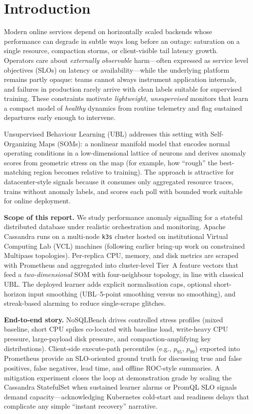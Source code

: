 \documentclass[sigconf]{acmart}
\begin{document}
\section{Introduction}
Modern online services depend on horizontally scaled backends whose performance can degrade in subtle ways long before an outage: saturation on a single resource, compaction storms, or client-visible tail latency growth. Operators care about \emph{externally observable} harm---often expressed as service level objectives (SLOs) on latency or availability---while the underlying platform remains partly opaque: teams cannot always instrument application internals, and failures in production rarely arrive with clean labels suitable for supervised training. These constraints motivate \emph{lightweight, unsupervised} monitors that learn a compact model of \emph{healthy} dynamics from routine telemetry and flag sustained departures early enough to intervene.

Unsupervised Behaviour Learning (UBL) addresses this setting with Self-Organizing Maps (SOMs): a nonlinear manifold model that encodes normal operating conditions in a low-dimensional lattice of neurons and derives anomaly scores from geometric stress on the map (for example, how ``rough'' the best-matching region becomes relative to training). The approach is attractive for datacenter-style signals because it consumes only aggregated resource traces, trains without anomaly labels, and scores each poll with bounded work suitable for online deployment.

\textbf{Scope of this report.}
We study performance anomaly signalling for a stateful distributed database under realistic orchestration and monitoring. Apache Cassandra runs on a multi-node \texttt{k3s} cluster hosted on institutional Virtual Computing Lab (VCL) machines (following earlier bring-up work on constrained Multipass topologies). Per-replica CPU, memory, and disk metrics are scraped with Prometheus and aggregated into cluster-level Tier~A feature vectors that feed a \emph{two-dimensional} SOM with four-neighbour topology, in line with classical UBL. The deployed learner adds explicit normalisation caps, optional short-horizon input smoothing (UBL--5-point smoothing versus no smoothing), and streak-based alarming to reduce single-scrape glitches.

\textbf{End-to-end story.}
NoSQLBench drives controlled stress profiles (mixed baseline, short CPU spikes co-located with baseline load, write-heavy CPU pressure, large-payload disk pressure, and compaction-amplifying key distributions). Client-side execute-path percentiles (e.g., $p_{95}$, $p_{99}$) exported into Prometheus provide an SLO-oriented ground truth for discussing true and false positives, false negatives, lead time, and offline ROC-style summaries. A mitigation experiment closes the loop at demonstration grade by scaling the Cassandra StatefulSet when sustained learner alarms or PromQL SLO signals demand capacity---acknowledging Kubernetes cold-start and readiness delays that complicate any simple ``instant recovery'' narrative.
\end{document}
